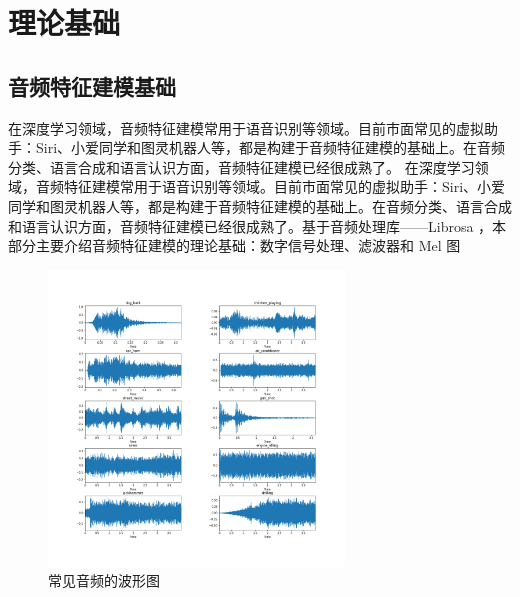 \chapter{理论基础}
\section{音频特征建模基础}
在深度学习领域，音频特征建模常用于语音识别等领域。目前市面常见的虚拟助手：Siri、小爱同学和图灵机器人等，都是构建于音频特征建模的基础上。在音频分类、语言合成和语言认识方面，音频特征建模已经很成熟了。
在深度学习领域，音频特征建模常用于语音识别等领域。目前市面常见的虚拟助手：Siri、小爱同学和图灵机器人等，都是构建于音频特征建模的基础上。在音频分类、语言合成和语言认识方面，音频特征建模已经很成熟了。基于音频处理库——Librosa ，本部分主要介绍音频特征建模的理论基础：数字信号处理、滤波器和 Mel 图\cite{mcfee2015librosa}

\begin{figure}[h]
  \centering
  \includegraphics[width=0.7\textwidth]{figures/基础音频.png}
  \caption{常见音频的波形图}
  \label{fig:boxingtu}
\end{figure}

